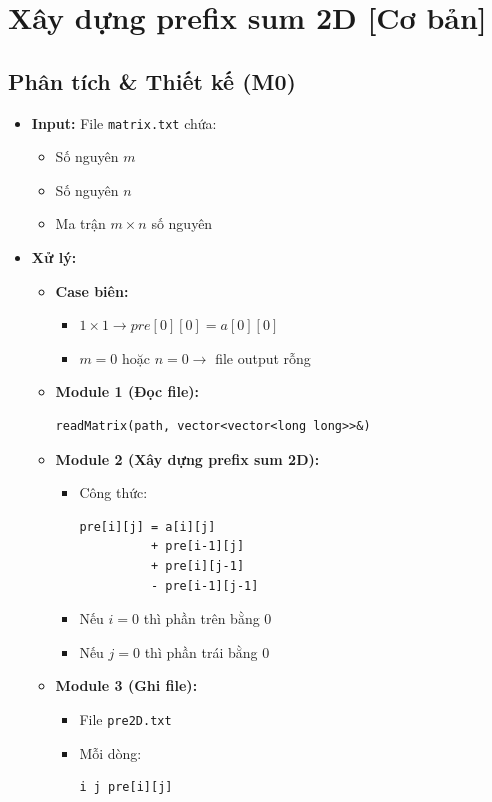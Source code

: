 \section{Xây dựng prefix sum 2D [Cơ bản]}
\subsection{Phân tích \& Thiết kế (M0)}

\begin{itemize}
    \item \textbf{Input:}  
    File \texttt{matrix.txt} chứa:
    \begin{itemize}
        \item Số nguyên $m$
        \item Số nguyên $n$
        \item Ma trận $m \times n$ số nguyên
    \end{itemize}

    \item \textbf{Xử lý:}
    \begin{itemize}
        \item \textbf{Case biên:}
        \begin{itemize}
            \item $1 \times 1 \rightarrow pre[0][0] = a[0][0]$
            \item $m=0$ hoặc $n=0 \rightarrow$ file output rỗng
        \end{itemize}

        \item \textbf{Module 1 (Đọc file):}
\begin{lstlisting}
readMatrix(path, vector<vector<long long>>&)
\end{lstlisting}

        \item \textbf{Module 2 (Xây dựng prefix sum 2D):}
        \begin{itemize}
            \item Công thức:
\begin{lstlisting}
pre[i][j] = a[i][j]
          + pre[i-1][j]
          + pre[i][j-1]
          - pre[i-1][j-1]
\end{lstlisting}
            \item Nếu $i=0$ thì phần trên bằng $0$
            \item Nếu $j=0$ thì phần trái bằng $0$
        \end{itemize}

        \item \textbf{Module 3 (Ghi file):}
        \begin{itemize}
            \item File \texttt{pre2D.txt}
            \item Mỗi dòng:
\begin{lstlisting}
i j pre[i][j]
\end{lstlisting}
        \end{itemize}
    \end{itemize}


\end{itemize}
